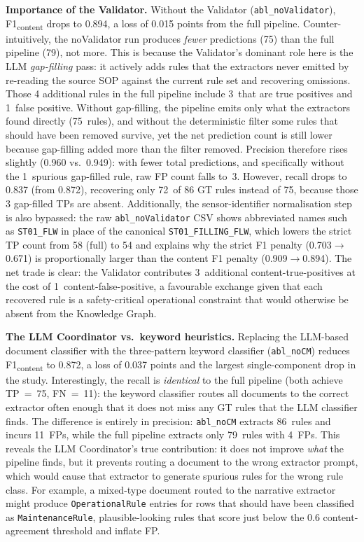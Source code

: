 ﻿\documentclass[11pt]{article}
\begin{document}
\textbf{Importance of the Validator.}
Without the Validator (\texttt{abl\_noValidator}),
F1\textsubscript{content} drops to 0.894, a loss of 0.015 points from the full
pipeline.
Counter-intuitively, the noValidator run produces \emph{fewer} predictions
(75) than the full pipeline (79), not more.  This is because the Validator's
dominant role here is the LLM \emph{gap-filling} pass: it actively adds rules
that the extractors never emitted by re-reading the source SOP against the
current rule set and recovering omissions.  Those 4 additional rules in the full
pipeline include 3~that are true positives and 1~false positive.
Without gap-filling, the pipeline emits only what the extractors found directly
(75~rules), and without the deterministic filter some rules that should have been
removed survive, yet the net prediction count is still lower because gap-filling
added more than the filter removed.
Precision therefore rises slightly (0.960 vs.\ 0.949): with fewer total predictions,
and specifically without the 1~spurious gap-filled rule, raw FP count falls to~3.
However, recall drops to 0.837 (from 0.872), recovering only 72~of 86 GT rules
instead of 75, because those 3 gap-filled TPs are absent.
Additionally, the sensor-identifier normalisation step is also bypassed: the raw
\texttt{abl\_noValidator} CSV shows abbreviated names such as \texttt{ST01\_FLW}
in place of the canonical \texttt{ST01\_FILLING\_FLW}, which lowers the strict
TP count from 58 (full) to 54 and explains why the strict F1 penalty
(0.703$\to$0.671) is proportionally larger than the content F1 penalty
(0.909$\to$0.894).
The net trade is clear: the Validator contributes 3~additional content-true-positives
at the cost of 1~content-false-positive, a favourable exchange given that each
recovered rule is a safety-critical operational constraint that would otherwise be
absent from the Knowledge Graph.

\textbf{The LLM Coordinator vs.\ keyword heuristics.}
Replacing the LLM-based document classifier with the three-pattern keyword
classifier (\texttt{abl\_noCM}) reduces F1\textsubscript{content} to 0.872, a
loss of 0.037 points and the largest single-component drop in the study.
Interestingly, the recall is \emph{identical} to the full pipeline (both achieve
TP~=~75, FN~=~11): the keyword classifier routes all documents to the correct
extractor often enough that it does not miss any GT rules that the LLM classifier
finds.
The difference is entirely in precision: \texttt{abl\_noCM} extracts 86~rules
and incurs 11~FPs, while the full pipeline extracts only 79~rules with 4~FPs.
This reveals the LLM Coordinator's true contribution: it does not improve
\emph{what} the pipeline finds, but it prevents routing a document to the wrong
extractor prompt, which would cause that extractor to generate spurious rules
for the wrong rule class.  For example, a mixed-type document routed to the
narrative extractor might produce \texttt{OperationalRule} entries for rows
that should have been classified as \texttt{MaintenanceRule}, plausible-looking
rules that score just below the 0.6 content-agreement threshold and inflate FP.
\end{document}
